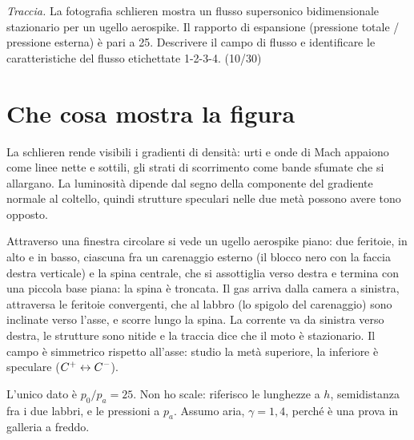 

\graphicspath{{../../svolgimenti/2023-07-17_B72-E01_aerospike/figure/}}



\maketitle

\emph{Traccia.} La fotografia schlieren mostra un flusso supersonico bidimensionale stazionario per un ugello
aerospike. Il rapporto di espansione (pressione totale / pressione esterna) è pari a 25. Descrivere il campo di flusso
e identificare le caratteristiche del flusso etichettate 1-2-3-4. (10/30)

\section*{Che cosa mostra la figura}
La schlieren rende visibili i gradienti di densità: urti e onde di Mach appaiono come linee nette e sottili, gli
strati di scorrimento come bande sfumate che si allargano. La luminosità dipende dal segno della componente del
gradiente normale al coltello, quindi strutture speculari nelle due metà possono avere tono opposto.

Attraverso una finestra circolare si vede un ugello aerospike piano: due feritoie, in alto e in basso, ciascuna fra un
carenaggio esterno (il blocco nero con la faccia destra verticale) e la spina centrale, che si assottiglia verso destra
e termina con una piccola base piana: la spina è troncata. Il gas arriva dalla camera a sinistra, attraversa le
feritoie convergenti, che al labbro (lo spigolo del carenaggio) sono inclinate verso l'asse, e scorre lungo la spina.
La corrente va da sinistra verso destra, le strutture sono nitide e la traccia dice che il moto è stazionario. Il
campo è simmetrico rispetto all'asse: studio la metà superiore, la inferiore è speculare ($C^{+}\leftrightarrow C^{-}$).

L'unico dato è $p_0/p_a=25$. Non ho scale: riferisco le lunghezze a $h$, semidistanza fra i due labbri, e le pressioni a
$p_a$. Assumo aria, $\gamma=1{,}4$, perché è una prova in galleria a freddo.

